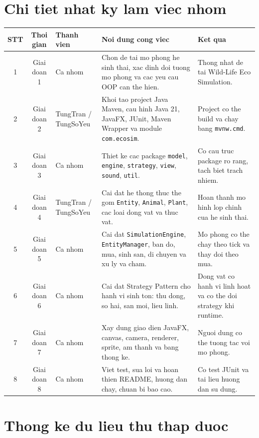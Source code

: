 \documentclass[12pt,a4paper]{article}
\begin{document}
\section{Chi tiet nhat ky lam viec nhom}

\begin{longtable}{|c|c|p{4cm}|p{6cm}|p{3cm}|}
    \hline
    \textbf{STT} & \textbf{Thoi gian} & \textbf{Thanh vien} & \textbf{Noi dung cong viec} & \textbf{Ket qua} \\
    \hline
    1 & Giai doan 1 & Ca nhom & Chon de tai mo phong he sinh thai, xac dinh doi tuong mo phong va cac yeu cau OOP can the hien. & Thong nhat de tai Wild-Life Eco Simulation. \\
    \hline
    2 & Giai doan 2 & TungTran / TungSoYeu & Khoi tao project Java Maven, cau hinh Java 21, JavaFX, JUnit, Maven Wrapper va module \texttt{com.ecosim}. & Project co the build va chay bang \texttt{mvnw.cmd}. \\
    \hline
    3 & Giai doan 3 & Ca nhom & Thiet ke cac package \texttt{model}, \texttt{engine}, \texttt{strategy}, \texttt{view}, \texttt{sound}, \texttt{util}. & Co cau truc package ro rang, tach biet trach nhiem. \\
    \hline
    4 & Giai doan 4 & TungTran / TungSoYeu & Cai dat he thong thuc the gom \texttt{Entity}, \texttt{Animal}, \texttt{Plant}, cac loai dong vat va thuc vat. & Hoan thanh mo hinh lop chinh cua he sinh thai. \\
    \hline
    5 & Giai doan 5 & Ca nhom & Cai dat \texttt{SimulationEngine}, \texttt{EntityManager}, ban do, mua, sinh san, di chuyen va xu ly va cham. & Mo phong co the chay theo tick va thay doi theo mua. \\
    \hline
    6 & Giai doan 6 & Ca nhom & Cai dat Strategy Pattern cho hanh vi sinh ton: thu dong, so hai, san moi, lieu linh. & Dong vat co hanh vi linh hoat va co the doi strategy khi runtime. \\
    \hline
    7 & Giai doan 7 & Ca nhom & Xay dung giao dien JavaFX, canvas, camera, renderer, sprite, am thanh va bang thong ke. & Nguoi dung co the tuong tac voi mo phong. \\
    \hline
    8 & Giai doan 8 & Ca nhom & Viet test, sua loi va hoan thien README, huong dan chay, chuan bi bao cao. & Co test JUnit va tai lieu huong dan su dung. \\
    \hline
\end{longtable}

\section{Thong ke du lieu thu thap duoc}
\end{document}
